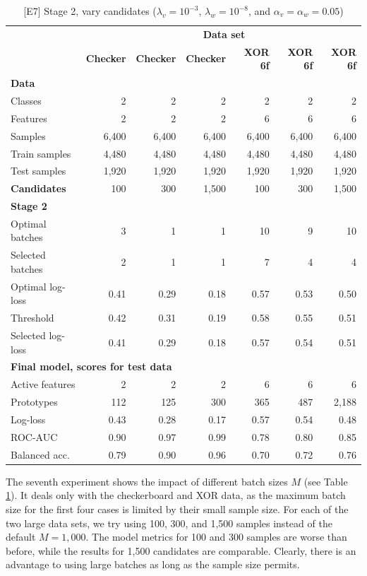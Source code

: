 \begin{table}
\caption{[E7] Stage 2, vary candidates ($\lambda_v=10^{-3}$, $\lambda_w=10^{-8}$, and $\alpha_v=\alpha_w=0.05$)}
\label{tab_e7}
%
\begin{center}
\small
\begin{tabular}{|lrrrrrr|}
\hline
&\multicolumn{6}{c|}{\textbf{\hrulefill\ Data set \hrulefill}}\\
&\textbf{Checker}&\textbf{Checker}&\textbf{Checker}&\textbf{XOR 6f}&\textbf{XOR 6f}&\textbf{XOR 6f}\\
\multicolumn{7}{|l|}{\textbf{Data}}\\
Classes&2&2&2&2&2&2\\
Features&2&2&2&6&6&6\\
Samples&6,400&6,400&6,400&6,400&6,400&6,400\\
Train samples&4,480&4,480&4,480&4,480&4,480&4,480\\
Test samples&1,920&1,920&1,920&1,920&1,920&1,920\\
\textbf{Candidates}&100&300&1,500&100&300&1,500\\
\multicolumn{7}{|l|}{\textbf{Stage 2}}\\
Optimal batches&3&1&1&10&9&10\\
Selected batches&2&1&1&7&4&4\\
Optimal log-loss&0.41&0.29&0.18&0.57&0.53&0.50\\
Threshold&0.42&0.31&0.19&0.58&0.55&0.51\\
Selected log-loss&0.41&0.29&0.18&0.57&0.54&0.51\\
\multicolumn{7}{|l|}{\textbf{Final model, scores for test data}}\\
Active features&2&2&2&6&6&6\\
Prototypes&112&125&300&365&487&2,188\\
Log-loss&0.43&0.28&0.17&0.57&0.54&0.48\\
ROC-AUC&0.90&0.97&0.99&0.78&0.80&0.85\\
Balanced acc.&0.79&0.90&0.96&0.70&0.72&0.76\\
\hline
\end{tabular}
\end{center}
\end{table}
%
The seventh experiment shows the impact of different batch sizes $M$ (see Table \ref{tab_e7}).
It deals only with the checkerboard and XOR data, as the maximum batch size for the first four cases is limited by their small sample size.
For each of the two large data sets, we try using 100, 300, and 1,500 samples instead of the default $M=1,000$.
The model metrics for 100 and 300 samples are worse than before, while the results for 1,500 candidates are comparable.
Clearly, there is an advantage to using large batches as long as the sample size permits.
%
